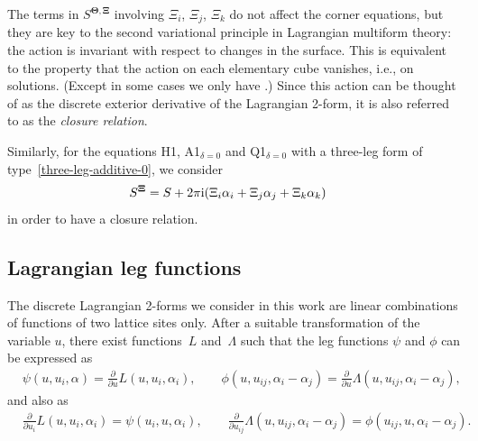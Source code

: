 \documentclass[pdftex]{sigma}
\newcommand{\pdv}[2]{\frac{\partial {#1}}{\partial {#2}}}
\renewcommand{\vec}{\boldsymbol}
\numberwithin{equation}{section}
\begin{document}
The terms in $S^{\vec \Theta,\vec \Xi}$ involving $\Xi_i$, $\Xi_j$, $\Xi_k$ do not affect the corner equations, but they are key to the second variational principle in Lagrangian multiform theory: the action is invariant with respect to changes in the surface. This is equivalent to the property that the action on each elementary cube vanishes, i.e., \smash{$S^{\vec \Theta,\vec \Xi} = 0$} on solutions. \big(Except in some cases we only have \smash{$S^{\vec \Theta,\vec \Xi} \equiv 0 \mod 4 \pi^2$}.\big) Since this action can be thought of as the discrete exterior derivative of the Lagrangian 2-form, it is also referred to as the \emph{closure relation}.

Similarly, for the equations H1, A1$_{\delta=0}$ and Q1$_{\delta=0}$ with a three-leg form of type~\eqref{three-leg-additive-0}, we consider
\begin{align*}
 S^{\vec \Xi} &= S + 2 \pi {\rm i} (\Xi_i \alpha_i + \Xi_j \alpha_j + \Xi_k \alpha_k)
\end{align*}
in order to have a closure relation.

\subsection{Lagrangian leg functions}

The discrete Lagrangian 2-forms we consider in this work are linear combinations of functions of two lattice sites only.
After a suitable transformation of the variable $u$, there exist functions~$L$ and~$\Lambda$ such that the leg functions $\psi$ and $\phi$ can be expressed as
\begin{align*}
	&\psi(u,u_i, \alpha)= \pdv{}{u} L(u,u_i,\alpha_i) , \qquad
	\phi(u,u_{ij}, \alpha_i - \alpha_j)= \pdv{}{u} \Lambda(u,u_{ij},\alpha_i-\alpha_j) ,
\end{align*}
and also as
\begin{align*}
	&\pdv{}{u_i} L(u,u_i,\alpha_i)= \psi(u_i,u,\alpha_i) , \qquad
	\pdv{}{u_{ij}} \Lambda(u,u_{ij},\alpha_i-\alpha_j)= \phi(u_{ij},u, \alpha_i-\alpha_j) .
\end{align*}
\end{document}
